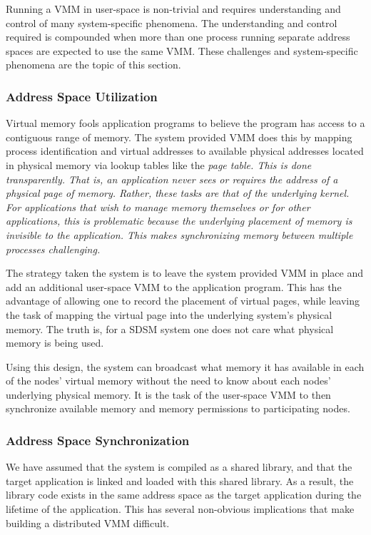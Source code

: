 Running a VMM in user-space is non-trivial and requires understanding and control of many system-specific phenomena.  The understanding and control required is compounded when more than one process running separate address spaces are expected to use the same VMM.  These challenges and system-specific phenomena are the topic of this section.

\subsubsection{Address Space Utilization}
Virtual memory fools application programs to believe the program has access to a contiguous range of memory.  The system provided VMM does this by mapping process identification and virtual addresses to available physical addresses located in physical memory via lookup tables like the \em page table\em.  This is done transparently.  That is, an application never sees or requires the address of a physical page of memory.  Rather, these tasks are that of the underlying kernel.  For applications that wish to manage memory themselves or for other applications, this is problematic because the underlying placement of memory is invisible to the application.  This makes synchronizing memory between multiple processes challenging.

The strategy taken the \projname{} system is to leave the system provided VMM in place and add an additional user-space VMM to the application program.  This has the advantage of allowing one to record the placement of virtual pages, while leaving the task of mapping the virtual page into the underlying system's physical memory.  The truth is, for a SDSM system one does not care what physical memory is being used.

Using this design, the \projname{} system can broadcast what memory it has available in each of the nodes' virtual memory without the need to know about each nodes' underlying physical memory.  It is the task of the user-space VMM to then synchronize available memory and memory permissions to participating nodes.

\subsubsection{Address Space Synchronization}

We have assumed that the \projname{} system is compiled as a shared library, and that the target application is linked and loaded with this shared library.  As a result, the library code exists in the same address space as the target application during the lifetime of the application.  This has several non-obvious implications that make building a distributed VMM difficult.  

